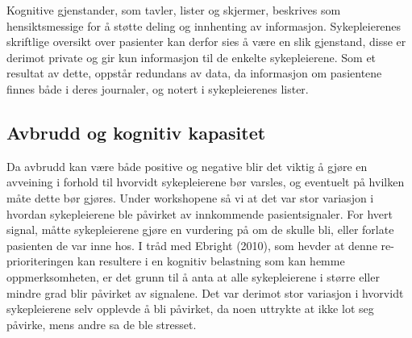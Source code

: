 \noindent
Kognitive gjenstander, som tavler, lister og skjermer, beskrives som hensiktsmessige for å støtte deling og innhenting av informasjon. Sykepleierenes skriftlige oversikt over pasienter kan derfor sies å være en slik gjenstand, disse er derimot private og gir kun informasjon til de enkelte sykepleierene. Som et resultat av dette, oppstår redundans av data, da informasjon om pasientene finnes både i deres journaler, og notert i sykepleierenes lister. 

\subsection{Avbrudd og kognitiv kapasitet}
Da avbrudd kan være både positive og negative blir det viktig å gjøre en avveining i forhold til hvorvidt sykepleierene bør varsles, og eventuelt på hvilken måte dette bør gjøres. Under workshopene så vi at det var stor variasjon i hvordan sykepleierene ble påvirket av innkommende pasientsignaler. For hvert signal, måtte sykepleierene gjøre en vurdering på om de skulle bli, eller forlate pasienten de var inne hos. I tråd med Ebright (2010), som hevder at denne re-prioriteringen kan resultere i en kognitiv belastning som kan hemme oppmerksomheten, er det grunn til å anta at alle sykepleierene i større eller mindre grad blir påvirket av signalene. Det var derimot stor variasjon i hvorvidt sykepleierene selv opplevde å bli påvirket, da noen uttrykte at ikke lot seg påvirke, mens andre sa de ble stresset.

